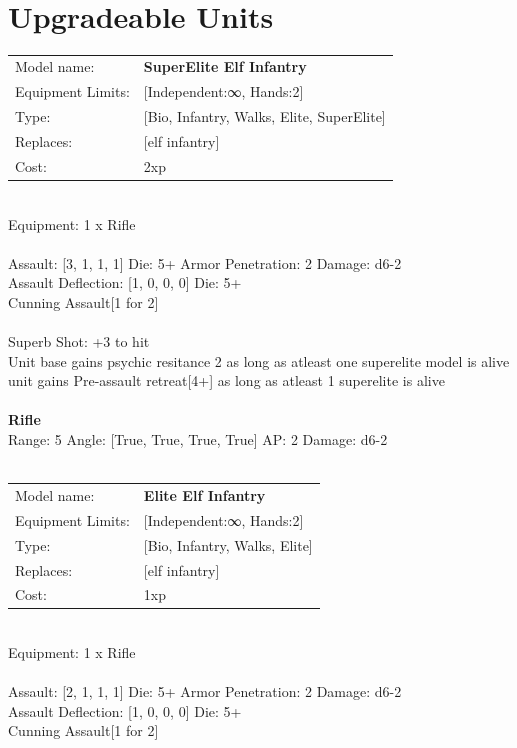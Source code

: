  
\ \\













\section{Upgradeable Units}\noindent
\begin{tabular}{ll}
Model name: &{\bf SuperElite Elf Infantry } \\
Equipment Limits: &[Independent:∞, Hands:2] \\
Type: &[Bio, Infantry, Walks, Elite, SuperElite] \\
Replaces: &[elf infantry] \\
Cost: & 2xp\\
\end{tabular}
\ \\
Equipment: 1 x Rifle \\
\ \\
Assault: [3, 1, 1, 1] Die: 5+ Armor Penetration: 2 Damage: d6-2 \\
Assault Deflection: [1, 0, 0, 0] Die: 5+\\
\indent Cunning Assault[1 for 2]\\ 
 
\ \\
Superb Shot: +3 to hit\\ 
Unit base gains psychic resitance 2 as long as atleast one superelite model is alive\\ 
unit gains Pre-assault retreat[4+] as long as atleast 1 superelite is alive\\ 

\ \\
{\bf Rifle } \\



Range: 5  Angle: [True, True, True, True] AP: 2 Damage: d6-2 \\




 
\ \\

\noindent
\begin{tabular}{ll}
Model name: &{\bf Elite Elf Infantry } \\
Equipment Limits: &[Independent:∞, Hands:2] \\
Type: &[Bio, Infantry, Walks, Elite] \\
Replaces: &[elf infantry] \\
Cost: & 1xp\\
\end{tabular}
\ \\
Equipment: 1 x Rifle \\
\ \\
Assault: [2, 1, 1, 1] Die: 5+ Armor Penetration: 2 Damage: d6-2 \\
Assault Deflection: [1, 0, 0, 0] Die: 5+\\
\indent Cunning Assault[1 for 2]\\ 
 
